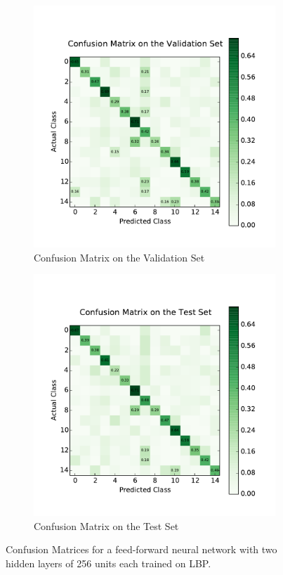 \begin{figure}
	\centering
	\begin{subfigure}[b]{0.45\linewidth}
		\centering
		\includegraphics[width=\linewidth]{images/0/cm_valid.pdf}
		\caption{Confusion Matrix on the Validation Set}
	\end{subfigure}
	\hfill
	\begin{subfigure}[b]{0.45\linewidth}
		\centering
		\includegraphics[width=\linewidth]{images/0/cm_test.pdf}
		\caption{Confusion Matrix on the Test Set}
	\end{subfigure}
	\caption{Confusion Matrices for a feed-forward neural network with two hidden layers of 256 units each trained on LBP.}
	\label{shrine0_mat}
\end{figure}

